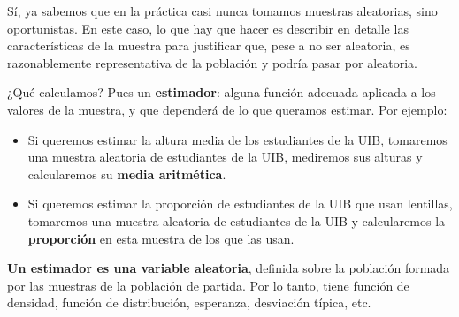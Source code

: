 \documentclass[
  spanish,
  letterpaper,
  DIV=11,
  numbers=noendperiod]{scrreprt}
\begin{document}
\begin{tcolorbox}[enhanced jigsaw, arc=.35mm, bottomrule=.15mm, bottomtitle=1mm, breakable, colback=white, colbacktitle=quarto-callout-tip-color!10!white, colframe=quarto-callout-tip-color-frame, coltitle=black, left=2mm, leftrule=.75mm, opacityback=0, opacitybacktitle=0.6, rightrule=.15mm, title=\textcolor{quarto-callout-tip-color}{\faLightbulb}\hspace{0.5em}{Tip}, titlerule=0mm, toprule=.15mm, toptitle=1mm]

Sí, ya sabemos que en la práctica casi nunca tomamos muestras
aleatorias, sino oportunistas. En este caso, lo que hay que hacer es
describir en detalle las características de la muestra para justificar
que, pese a no ser aleatoria, es razonablemente representativa de la
población y podría pasar por aleatoria.

\end{tcolorbox}

¿Qué calculamos? Pues un \textbf{estimador}: alguna función adecuada
aplicada a los valores de la muestra, y que dependerá de lo que queramos
estimar. Por ejemplo:

\begin{itemize}
\item
  Si queremos estimar la altura media de los estudiantes de la UIB,
  tomaremos una muestra aleatoria de estudiantes de la UIB, mediremos
  sus alturas y calcularemos su \textbf{media aritmética}.
\item
  Si queremos estimar la proporción de estudiantes de la UIB que usan
  lentillas, tomaremos una muestra aleatoria de estudiantes de la UIB y
  calcularemos la \textbf{proporción} en esta muestra de los que las
  usan.
\end{itemize}

\begin{tcolorbox}[enhanced jigsaw, arc=.35mm, bottomrule=.15mm, bottomtitle=1mm, breakable, colback=white, colbacktitle=quarto-callout-important-color!10!white, colframe=quarto-callout-important-color-frame, coltitle=black, left=2mm, leftrule=.75mm, opacityback=0, opacitybacktitle=0.6, rightrule=.15mm, title=\textcolor{quarto-callout-important-color}{\faExclamation}\hspace{0.5em}{Importante}, titlerule=0mm, toprule=.15mm, toptitle=1mm]

\textbf{Un estimador es una variable aleatoria}, definida sobre la
población formada por las muestras de la población de partida. Por lo
tanto, tiene función de densidad, función de distribución, esperanza,
desviación típica, etc.

\end{tcolorbox}
\end{document}
